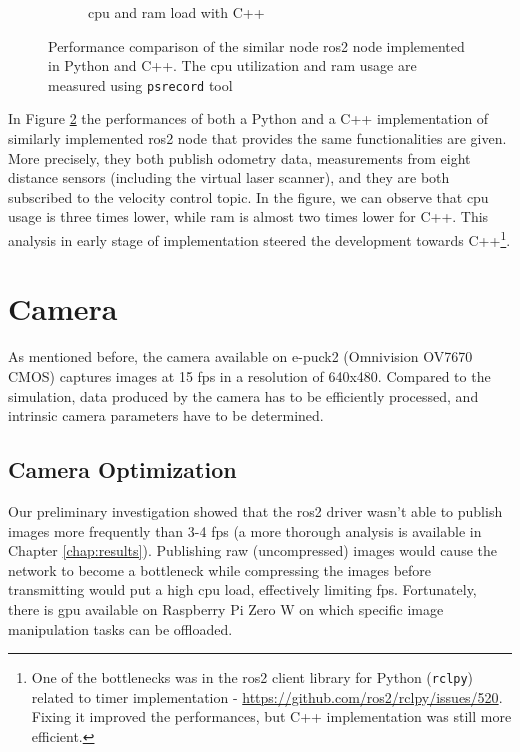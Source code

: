 \begin{figure}[H]
\begin{subfigure}{.8\textwidth}
  \caption{\ac{cpu} and \ac{ram} load with C++}
  \label{fig:physical:py_vs_cpp:cpp}
\end{subfigure}
\caption[Performance comparison of implementations in Python and C++]{Performance comparison of the similar node \ac{ros2} node implemented in Python and C++. The \ac{cpu} utilization and \ac{ram} usage are measured using \texttt{psrecord} tool\footnotemark}
\label{fig:physical:py_vs_cpp}
\end{figure}

In Figure \ref{fig:physical:py_vs_cpp} the performances of both a Python and a C++ implementation of similarly implemented \ac{ros2} node that provides the same functionalities are given.
More precisely, they both publish odometry data, measurements from eight distance sensors (including the virtual laser scanner), and they are both subscribed to the velocity control topic.
In the figure, we can observe that \ac{cpu} usage is three times lower, while \ac{ram} is almost two times lower for C++.
This analysis in early stage of implementation steered the development towards C++\footnote{One of the bottlenecks was in the \ac{ros2} client library for Python (\texttt{rclpy}) related to timer implementation - \url{https://github.com/ros2/rclpy/issues/520}. Fixing it improved the performances, but C++ implementation was still more efficient.}.

\section{Camera}
As mentioned before, the camera available on e-puck2 (Omnivision OV7670 CMOS) captures images at 15 \acs{fps} in a resolution of 640x480.
Compared to the simulation, data produced by the camera has to be efficiently processed, and intrinsic camera parameters have to be determined.

\subsection{Camera Optimization}
Our preliminary investigation showed that the \ac{ros2} driver wasn't able to publish images more frequently than 3-4 \acs{fps} (a more thorough analysis is available in Chapter \ref{chap:results}).
Publishing raw (uncompressed) images would cause the network to become a bottleneck while compressing the images before transmitting would put a high \ac{cpu} load, effectively limiting \ac{fps}.
Fortunately, there is \ac{gpu} available on Raspberry Pi Zero W on which specific image manipulation tasks can be offloaded.

